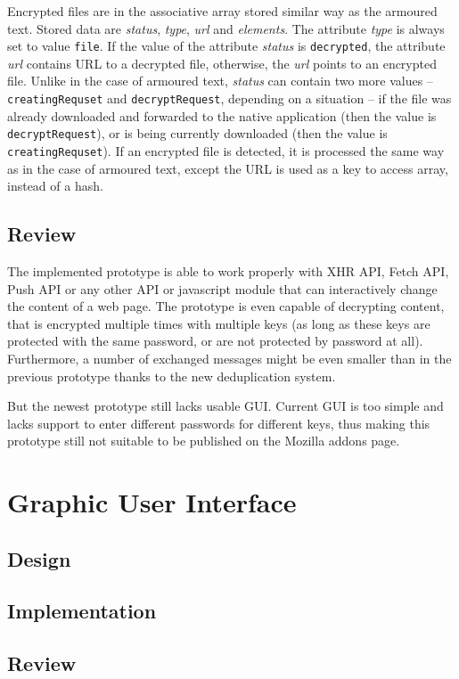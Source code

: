 Encrypted files are in the associative array stored similar way as the armoured text. Stored data are \textit{status}, \textit{type}, \textit{url} and \textit{elements}. The attribute \textit{type} is always set to value \texttt{file}. If the value of the attribute \textit{status} is \texttt{decrypted}, the attribute \textit{url} contains URL to a decrypted file, otherwise, the \textit{url} points to an encrypted file. Unlike in the case of armoured text, \textit{status} can contain two more values -- \texttt{creatingRequset} and \texttt{decryptRequest}, depending on a situation -- if the file was already downloaded and forwarded to the native application (then the value is \texttt{decryptRequest}), or is being currently downloaded (then the value is \texttt{creatingRequset}). If an encrypted file is detected, it is processed the same way as in the case of armoured text, except the URL is used as a key to access array, instead of a hash.

\subsection{Review}
The implemented prototype is able to work properly with XHR API, Fetch API, Push API or any other API or javascript module that can interactively change the content of a web page. The prototype is even capable of decrypting content, that is encrypted multiple times with multiple keys (as long as these keys are protected with the same password, or are not protected by password at all). Furthermore, a number of exchanged messages might be even smaller than in the previous prototype thanks to the new deduplication system.

But the newest prototype still lacks usable GUI. Current GUI is too simple and lacks support to enter different passwords for different keys, thus making this prototype still not suitable to be published on the Mozilla addons page.

\section{Graphic User Interface}
\subsection{Design}
\subsection{Implementation}
\subsection{Review}

